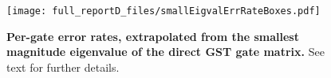 {\begin{figure}
\begin{center}
\texttt{[image: full\_reportD\_files/smallEigvalErrRateBoxes.pdf]}
\caption{\textbf{Per-gate error rates, extrapolated from the smallest magnitude eigenvalue of the direct GST gate matrix.}  See text for further details.\label{smallEigvalErrRateColorBoxPlot}}
\end{center}
\end{figure}


}{}


